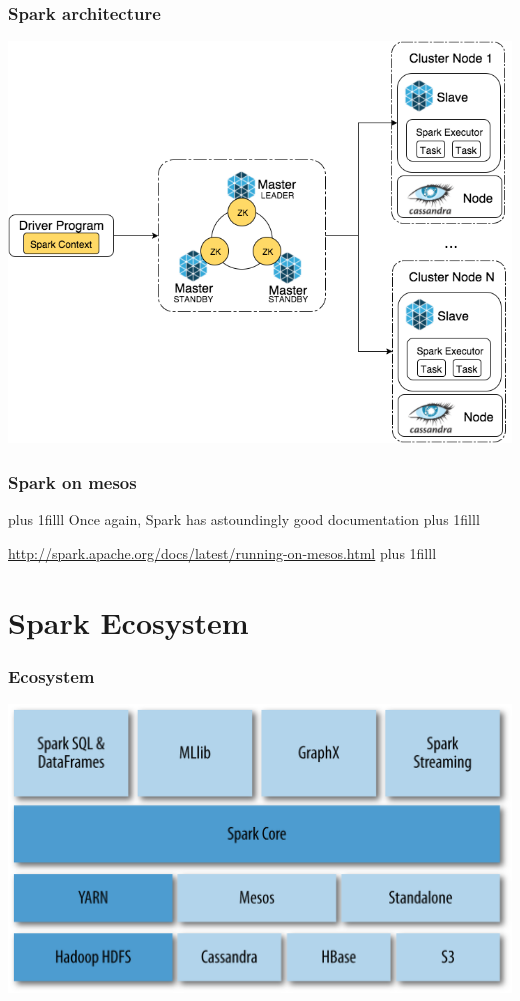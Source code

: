 \documentclass{beamer}
\newcommand{\btVFill}{\vskip0pt plus 1filll}
\begin{document}
\begin{frame}
  \frametitle{Spark architecture}
  \includegraphics[height=.85\textheight]{images/mesos-spark.png}
\end{frame}

\begin{frame}
  \frametitle{Spark on mesos}
  \btVFill
  \center
  {\Large Once again, Spark has astoundingly good documentation}
  \btVFill

{\large  \href{http://spark.apache.org/docs/latest/running-on-mesos.html}{http://spark.apache.org/docs/latest/running-on-mesos.html}}
  \btVFill
\end{frame}


  
\section{Spark Ecosystem}

\begin{frame}
  \frametitle{Ecosystem}
  \includegraphics[width=\textwidth]{images/sparkecosystem.png}
\end{frame}
\end{document}
